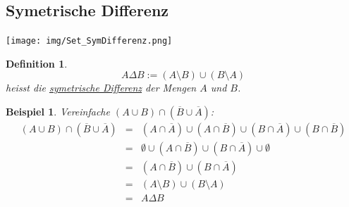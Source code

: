 \documentclass{report}
\newtheorem{mydef}{Definition}
\newtheorem{myexample}{Beispiel}
\begin{document}
\subsection{Symetrische Differenz}
\begin{center}\texttt{[image: img/Set\_SymDifferenz.png]}\end{center}
\begin{mydef}\begin{equation}A \Delta B := (A \setminus B) \cup (B \setminus A)\end{equation}
heisst die \underline{symetrische Differenz} der Mengen $A$ und $B$.\end{mydef}
\begin{myexample}Vereinfache $(A \cup B) \cap (\overline{B} \cup \overline{A})$:
\begin{eqnarray}(A \cup B) \cap (\overline{B} \cup \overline{A}) & = & (A \cap \overline{A}) \cup (A \cap \overline{B}) \cup (B \cap \overline{A}) \cup (B \cap \overline{B})\\ \nonumber
& = & \emptyset \cup (A \cap \overline{B}) \cup (B \cap \overline{A}) \cup \emptyset \\ \nonumber
& = & (A \cap \overline{B}) \cup (B \cap \overline{A})\\ \nonumber
& = & (A \setminus B) \cup (B \setminus A)\\ \nonumber
& = & A \Delta B\end{eqnarray}\end{myexample}
\end{document}

